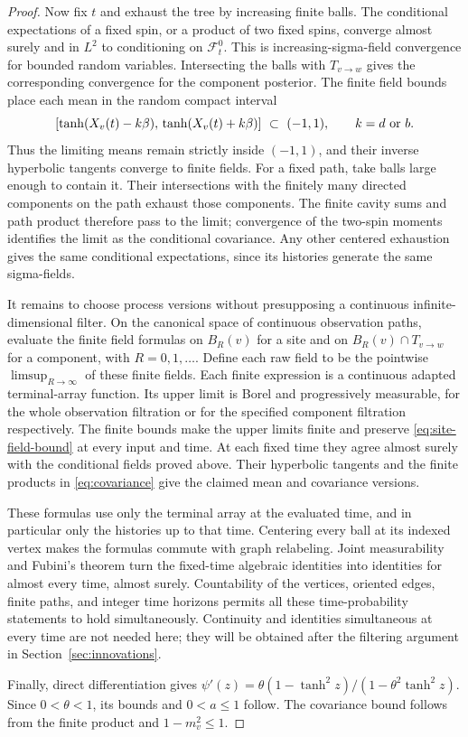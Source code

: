 \begin{proof}
Now fix \(t\) and exhaust the tree by increasing finite balls.
The conditional expectations of a fixed spin, or a product of two
fixed spins, converge almost surely and in \(L^2\) to conditioning
on \(\mathcal F_t^0\).  This is increasing-sigma-field convergence
for bounded random variables.  Intersecting the balls with
\(T_{v\to w}\) gives the corresponding convergence for the component
posterior.  The finite field bounds place each mean in the random
compact interval
\[
 [\tanh(X_v(t)-k\beta),\,\tanh(X_v(t)+k\beta)]
       \ \subset\ (-1,1),\qquad k=d\ \hbox{or}\ b.
\]
Thus the limiting means remain strictly inside \((-1,1)\), and their
inverse hyperbolic tangents converge to finite fields.
For a fixed path, take balls large enough to contain it.  Their
intersections with the finitely many directed components on the path
exhaust those components.  The finite cavity sums and path product
therefore pass to the limit; convergence of the two-spin moments
identifies the limit as the conditional covariance.  Any other centered
exhaustion gives the same conditional expectations, since its histories
generate the same sigma-fields.

It remains to choose process versions without presupposing a continuous
infinite-dimensional filter.  On the canonical space of continuous
observation paths, evaluate the finite field formulas on \(B_R(v)\)
for a site and on \(B_R(v)\cap T_{v\to w}\) for a component, with
\(R=0,1,\ldots\).  Define each raw field to be the pointwise
\(\limsup_{R\to\infty}\) of these finite fields.  Each finite expression
is a continuous adapted terminal-array function.  Its upper limit is
Borel and progressively measurable, for the whole observation
filtration or for the specified component filtration respectively.
The finite bounds make the upper limits finite and preserve
\eqref{eq:site-field-bound} at every input and time.  At each fixed
time they agree almost surely with the conditional fields proved above.
Their hyperbolic tangents and the finite products in
\eqref{eq:covariance} give the claimed mean and covariance versions.

These formulas use only the terminal array at the evaluated time, and
in particular only the histories up to that time.  Centering every
ball at its indexed vertex makes the formulas commute with graph
relabeling.  Joint measurability and Fubini's theorem turn the
fixed-time algebraic identities into identities for almost every time,
almost surely.  Countability of the vertices, oriented edges, finite
paths, and integer time horizons permits all these time-probability
statements to hold simultaneously.  Continuity and identities
simultaneous at every time are not needed here; they will be obtained
after the filtering argument in Section~\ref{sec:innovations}.

Finally, direct differentiation gives
\(\psi'(z)=\theta(1-\tanh^2z)/(1-\theta^2\tanh^2z)\).
Since \(0<\theta<1\), its bounds and \(0<a\le1\) follow.
The covariance bound follows from the finite product and
\(1-m_v^2\le1\).
\end{proof}

